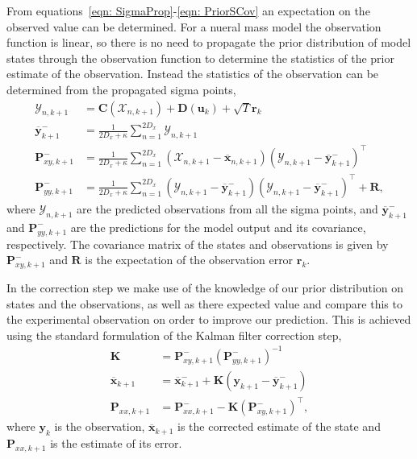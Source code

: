 \documentclass[10pt]{article}%
\begin{document}
From equations~\ref{eqn: SigmaProp}-\ref{eqn: PriorSCov} an expectation on the observed value can be determined. For a nueral mass model the observation function is linear, so there is no need to propagate the prior distribution of model states through the observation function to determine the statistics of the prior estimate of the observation. Instead the statistics of the observation can be determined from the propagated sigma points,
\begin{align}
\mathbf{\mathcal{Y}}_{n,k+1} &= \mathbf{C}(\mathbf{\mathcal{X}}_{n,k+1})+ \mathbf{D}(\mathbf{u}_{k})+ \sqrt{T}\mathbf{r}_{k}\\
\overline{\mathbf{y}}_{k+1}^{-} &= \frac{1}{2D_{x}+\kappa}\sum_{n=1}^{2D_{x}} \mathbf{\mathcal{Y}}_{n,k+1}\\
\label{eqn: statecovg}
\mathbf{P}_{xy,k+1}^{-} &= \frac{1}{2D_{x}+\kappa}\sum_{n=1}^{2D_{x}} (\mathbf{\mathcal{X}}_{n,k+1}-\overline{\mathbf{x}}_{n,k+1}) (\mathbf{\mathcal{Y}}_{n,k+1}-\overline{\mathbf{y}}_{k+1}^{-})^{\top}\\
\mathbf{P}_{yy,k+1}^{-} &= \frac{1}{2D_{x}+\kappa}\sum_{n=1}^{2D_{x}} (\mathbf{\mathcal{Y}}_{n,k+1}-\overline{\mathbf{y}}_{k+1}^{-}) (\mathbf{\mathcal{Y}}_{n,k+1}-\overline{\mathbf{y}}_{k+1}^{-})^{\top} +\mathbf{R},%
\end{align} where $\mathbf{\mathcal{Y}}_{n,k+1}$ are the predicted observations from all the sigma points, and $\overline{\mathbf{y}}_{k+1}^{-}$ and $\mathbf{P}_{yy,k+1}^{-}$ are the predictions for the model output and its covariance, respectively. The covariance matrix of the states and observations is given by $\mathbf{P}_{xy,k+1}^{-}$  and $\mathbf{R}$ is the expectation of the observation error $\mathbf{r}_{k}$.

In the correction step we make use of the knowledge of our prior distribution on states and the observations, as well as there expected value and compare this to the experimental observation on order to improve our prediction. This is achieved using the standard formulation of the Kalman filter correction step,
\begin{align}
\mathbf{K} &= \mathbf{P}_{xy,k+1}^{-}(\mathbf{P}_{yy,k+1}^{-})^{-1}\\
\overline{\mathbf{x}}_{k+1} &= \overline{\mathbf{x}}_{k+1}^{-} + \mathbf{K}(\mathbf{y}_{k+1}-\overline{\mathbf{y}}_{k+1}^{-})\\
\mathbf{P}_{xx,k+1} &= \mathbf{P}_{xx,k+1}^{-} - \mathbf{K}(\mathbf{P}_{xy,k+1}^{-})^{\top},
\end{align} where $\mathbf{y}_{k}$ is the observation, $\overline{\mathbf{x}}_{k+1}$ is the corrected estimate of the state and $\mathbf{P}_{xx,k+1}$ is the estimate of its error.
\end{document}
